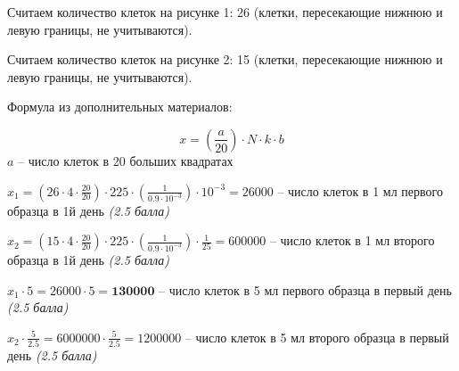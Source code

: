 Считаем количество клеток на рисунке 1: 26 (клетки, пересекающие нижнюю и левую границы, не учитываются).

Считаем количество клеток на рисунке 2: 15 (клетки, пересекающие нижнюю и левую границы, не учитываются).

Формула из дополнительных материалов:

$$x=(\frac{a}{20})\cdot N\cdot k\cdot b$$
$a$ – число клеток в 20 больших квадратах

$x_1 = \left(26\cdot4\cdot\frac{20}{20}\right)\cdot225\cdot\left(\frac{1}{0.9\cdot10^{-3}}\right)\cdot10^{-3} = 26000$ – число клеток в 1 мл первого образца в 1й день \textit{(2.5 балла)}

$x_2 = \left(15\cdot4\cdot\frac{20}{20}\right)\cdot225\cdot\left(\frac{1}{0.9\cdot10^{-3}}\right)\cdot\frac{1}{25} = 600000$ – число клеток в 1 мл второго образца в 1й день \textit{(2.5 балла)}

$x_1\cdot5=26000\cdot5=\textbf{130000}$ – число клеток в 5 мл первого образца в первый день \textit{(2.5 балла)}

$x_2\cdot\frac{5}{2.5}=6000000\cdot\frac{5}{2.5}=1200000$ – число клеток в 5 мл второго образца в первый день \textit{(2.5 балла)}